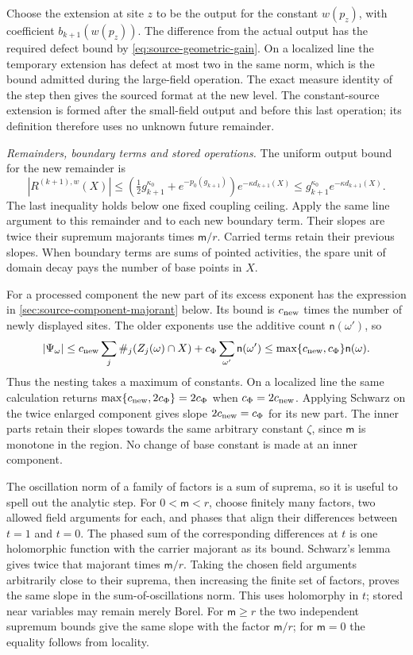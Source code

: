 \documentclass[11pt,letterpaper,reqno]{amsart}
\theoremstyle{definition}
\theoremstyle{remark}
\begin{document}
Choose the extension at site $z$ to be the output for the constant
$w(p_z)$, with coefficient $b_{k+1}(w(p_z))$.
The difference from the actual output has the required defect
bound by \eqref{eq:source-geometric-gain}. On a localized line the
temporary extension has defect at most two in the same norm,
which is the bound admitted during the large-field operation.
The exact measure identity of the step then gives the sourced
format at the new level. The constant-source extension is formed
after the small-field output and before this last operation; its
definition therefore uses no unknown future remainder.

\emph{Remainders, boundary terms and stored operations.}
The uniform output bound for the new remainder is
\[
 |R^{(k+1),w}(X)|
 \le\left(\tfrac12g_{k+1}^{\kappa_0}
                   +e^{-p_0(g_{k+1})}\right)e^{-\kappa d_{k+1}(X)}
 \le g_{k+1}^{\kappa_0}e^{-\kappa d_{k+1}(X)}.
\]
The last inequality holds below one fixed coupling ceiling.
Apply the same line argument to this remainder and to each new
boundary term. Their slopes are twice their supremum majorants
times $\mathsf m/r$. Carried terms retain their previous slopes.
When boundary terms are sums of pointed activities, the spare
unit of domain decay pays the number of base points in $X$.

For a processed component the new part of its excess exponent has
the expression in \cref{sec:source-component-majorant} below.
Its bound is $c_{\rm new}$ times the number of newly displayed
sites. The older exponents use the additive count
$\mathsf n(\omega')$, so
\[
 |\Psi_\omega|
 \le c_{\rm new}\sum_j\#_j(Z_j(\omega)\cap X)
                 +c_\Phi\sum_{\omega'}\mathsf n(\omega')
 \le\max\{c_{\rm new},c_\Phi\}\mathsf n(\omega).
\]
Thus the nesting takes a maximum of constants. On a localized
line the same calculation returns
$\max\{c_{\rm new},2c_\Phi\}=2c_\Phi$ when
$c_\Phi=2c_{\rm new}$. Applying Schwarz on the twice enlarged
component gives slope $2c_{\rm new}=c_\Phi$ for its new part.
The inner parts retain their slopes towards the same arbitrary
constant $\zeta$, since $\mathsf m$ is monotone in the region.
No change of base constant is made at an inner component.

The oscillation norm of a family of factors is a sum of suprema,
so it is useful to spell out the analytic step. For
$0<\mathsf m<r$, choose finitely
many factors, two allowed field arguments for each, and phases
that align their differences between $t=1$ and $t=0$.
The phased sum of the corresponding differences at $t$ is one
holomorphic function with the carrier majorant as its bound.
Schwarz's lemma gives twice that majorant times $\mathsf m/r$.
Taking the chosen field arguments arbitrarily close to their
suprema, then increasing the finite set of factors, proves the
same slope in the sum-of-oscillations norm. This uses holomorphy
in $t$; stored near variables may remain merely Borel.
For $\mathsf m\ge r$ the two independent supremum bounds give
the same slope with the factor $\mathsf m/r$; for $\mathsf m=0$
the equality follows from locality.
\end{document}
